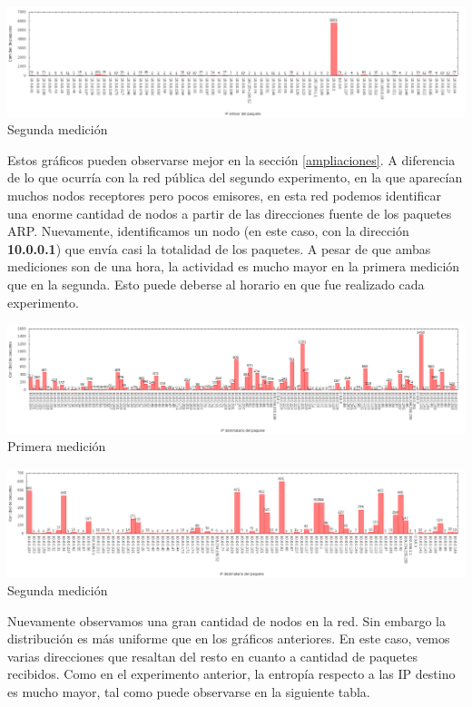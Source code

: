 \begin{center}
\includegraphics[width=16cm]{../mediciones/job2/src.png}
Segunda medición
\end{center}

Estos gráficos pueden observarse mejor en la sección \ref{ampliaciones}.
A diferencia de lo que ocurría con la red pública del segundo experimento, en la que aparecían muchos nodos receptores pero pocos emisores,
en esta red podemos identificar una enorme cantidad de nodos a partir de las direcciones fuente de los paquetes ARP.
Nuevamente, identificamos un nodo (en este caso, con la dirección \textbf{10.0.0.1}) que envía casi la totalidad de los paquetes.
A pesar de que ambas mediciones son de una hora, la actividad es mucho mayor en la primera medición que en la segunda. Esto puede
deberse al horario en que fue realizado cada experimento.

\begin{center}
\includegraphics[width=16cm]{../mediciones/job1/dst.png}
Primera medición
\end{center}

\begin{center}
\includegraphics[width=16cm]{../mediciones/job2/dst.png}
Segunda medición
\end{center}

Nuevamente observamos una gran cantidad de nodos en la red. Sin embargo la distribución es más uniforme que en los gráficos anteriores.
En este caso, vemos varias direcciones que resaltan del resto en cuanto a cantidad de paquetes recibidos. Como en el experimento anterior,
la entropía respecto a las IP destino es mucho mayor, tal como puede observarse en la siguiente tabla.

